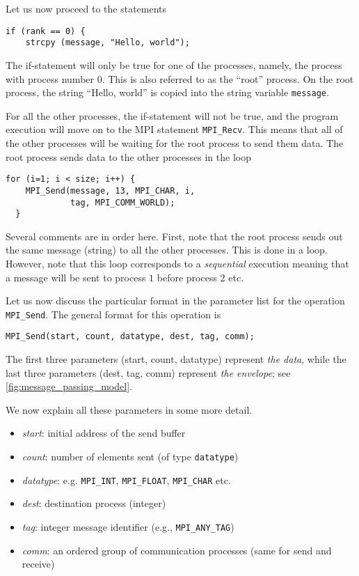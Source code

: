 Let us now proceed to the statements
\begin{lstlisting}[style=c]
  if (rank == 0) {
    strcpy (message, "Hello, world");
\end{lstlisting}
The if-statement will only be true for one of the processes, namely, the process
with process number 0. This is also referred to as the ``root'' process. On the
root process, the string ``Hello, world'' is copied into the string variable
\texttt{message}.

For all the other processes, the if-statement will not be true, and the program
execution will move on to the MPI statement \texttt{MPI\_Recv}. This means that
all of the other processes will be waiting for the root process to send them
data. The root process sends data to the other processes in the loop
\begin{lstlisting}[style=c]
  for (i=1; i < size; i++) {
    MPI_Send(message, 13, MPI_CHAR, i,
             tag, MPI_COMM_WORLD);
  }
\end{lstlisting}
Several comments are in order here. First, note that the root process sends out
the same message (string) to all the other processes. This is done in a loop.
However, note that this loop corresponds to a \emph{sequential} execution
meaning that a message will be sent to process $1$ before process $2$ etc.

Let us now discuss the particular format in the parameter list for the operation
\texttt{MPI\_Send}. The general format for this operation is
\begin{lstlisting}[style=c]
  MPI_Send(start, count, datatype, dest, tag, comm);
\end{lstlisting}
The first three parameters (start, count, datatype) represent \emph{the data},
while the last three parameters (dest, tag, comm) represent \emph{the envelope};
see \autoref{fig:message_passing_model}.

We now explain all these parameters in some more detail.
\begin{itemize}
\item \emph{start}: initial address of the send buffer
\item \emph{count}: number of elements sent (of type \texttt{datatype})
\item \emph{datatype}: e.g. \texttt{MPI\_INT}, \texttt{MPI\_FLOAT}, \texttt{MPI\_CHAR} etc.
\item \emph{dest}: destination process (integer)
\item \emph{tag}: integer message identifier (e.g., \texttt{MPI\_ANY\_TAG})
\item \emph{comm}: an ordered group of communication processes (same for send
  and receive)
\end{itemize}

